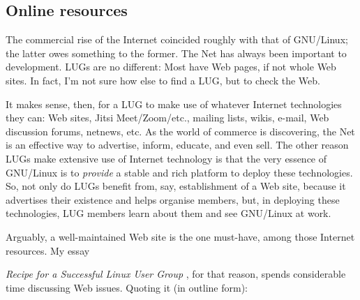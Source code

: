 \subsection{Online resources}

The commercial rise of the Internet coincided roughly with that of
GNU/Linux; the latter owes something to the former. The Net has always been
important to development. LUGs are no different: Most have Web
pages, if not whole Web sites. In fact, I'm not sure how else to find a
LUG, but to check the Web.  

It makes sense, then, for a LUG to make use of whatever Internet
technologies they can: Web sites, Jitsi Meet/Zoom/etc., mailing lists, 
wikis, e-mail, Web discussion forums, netnews, etc. As the world of commerce is
discovering, the Net is an effective way to advertise, inform, educate,
and even sell. The other reason LUGs make extensive use of Internet
technology is that the very essence of GNU/Linux is to {\itshape provide\/} a stable and rich platform to deploy these technologies. So,
not only do LUGs benefit from, say, establishment of a Web site,
because it advertises their existence and helps organise members,
but, in deploying these technologies, LUG members 
learn about them and see GNU/Linux at work.

Arguably, a well-maintained Web site is the one must-have, among those
Internet resources.  My essay

\emph{Recipe for a Successful Linux User Group} \texttt{\aduurl}
, for that reason,
spends considerable time discussing Web issues.  Quoting it (in outline form):

